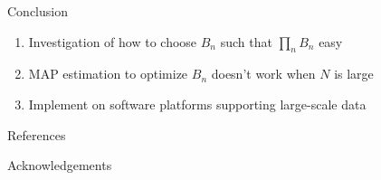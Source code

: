 \documentclass[final]{beamer}
\newlength{\onecolwid}
\begin{document}
\begin{frame}[t]
\begin{columns}[t]
\begin{column}{\onecolwid}
\begin{block}{Conclusion}

\begin{enumerate}
  \item Investigation of how to choose $B_n$ such that $\prod_n B_n$ easy
  \item MAP estimation to optimize $B_n$ doesn't work when $N$ is large
  \item Implement on software platforms supporting large-scale data
\end{enumerate}

\end{block}


\begin{block}{References}

\nocite{*} %
\small{
\vspace{0.75in}}

\end{block}



\begin{block}{Acknowledgements}

\small{} \\

\end{block}




\end{column}
\end{columns}
\end{frame}
\end{document}

